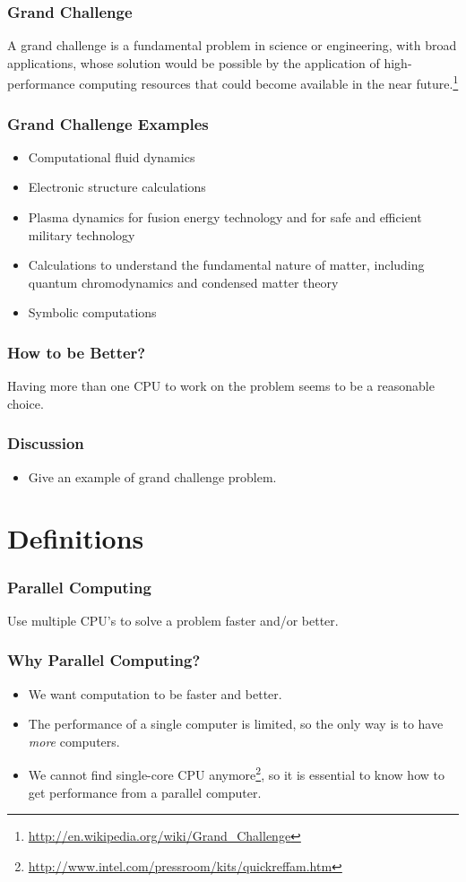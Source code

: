 \documentclass{beamer}
\begin{document}
\begin{CJK}{UTF8}{bsmi}
\begin{frame}
\frametitle{Grand Challenge} A grand challenge is a fundamental problem in science or engineering, with broad applications, whose solution would be possible by the application of high-performance computing resources that could become available in the near future.\footnote{\url{http://en.wikipedia.org/wiki/Grand_Challenge}}
\end{frame}

\begin{frame}
\frametitle{Grand Challenge Examples} 
\begin{itemize}
\item Computational fluid dynamics
\item Electronic structure calculations
\item Plasma dynamics for fusion energy technology and for safe and
  efficient military technology
\item Calculations to understand the fundamental nature of matter,
  including quantum chromodynamics and condensed matter theory
\item Symbolic computations
\end{itemize}
\end{frame}

\begin{frame}
\frametitle{How to be Better?}
\Huge Having more than one CPU to work on the problem seems to be a
  reasonable choice.
\end{frame}

\begin{frame}
\frametitle{Discussion} 
\begin{itemize}
\item Give an example of grand challenge problem.
\end{itemize}
\end{frame}


\section{Definitions}

\begin{frame}
\frametitle{Parallel Computing}  \Huge Use multiple CPU's to solve a
problem faster and/or better.
\end{frame}

\begin{frame}
\frametitle{Why Parallel Computing?}
\begin{itemize}
\item We want computation to be faster and better.
\item The performance of a single computer is limited, so the only way
  is to have {\em more} computers.
\item We cannot find single-core CPU
  anymore\footnote{\url{http://www.intel.com/pressroom/kits/quickreffam.htm}},
  so it is essential to know how to get performance from a parallel
  computer.
\end{itemize}
\end{frame}


\end{CJK}
\end{document}
